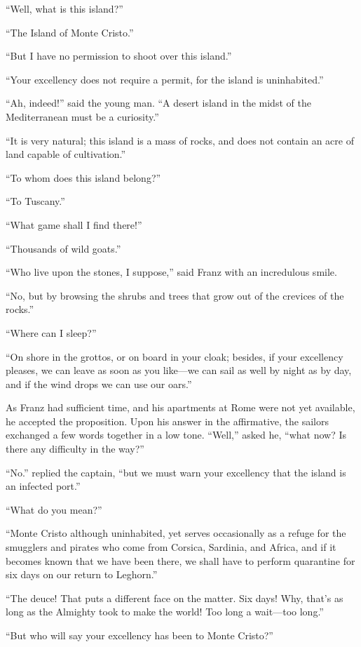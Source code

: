 “Well, what is this island?”

“The Island of Monte Cristo.”

“But I have no permission to shoot over this island.”

“Your excellency does not require a permit, for the island is
uninhabited.”

“Ah, indeed!” said the young man. “A desert island in the midst of the
Mediterranean must be a curiosity.”

“It is very natural; this island is a mass of rocks, and does not
contain an acre of land capable of cultivation.”

“To whom does this island belong?”

“To Tuscany.”

“What game shall I find there!”

“Thousands of wild goats.”

“Who live upon the stones, I suppose,” said Franz with an incredulous
smile.

“No, but by browsing the shrubs and trees that grow out of the crevices
of the rocks.”

“Where can I sleep?”

“On shore in the grottos, or on board in your cloak; besides, if your
excellency pleases, we can leave as soon as you like—we can sail as
well by night as by day, and if the wind drops we can use our oars.”

As Franz had sufficient time, and his apartments at Rome were not yet
available, he accepted the proposition. Upon his answer in the
affirmative, the sailors exchanged a few words together in a low tone.
“Well,” asked he, “what now? Is there any difficulty in the way?”

“No.” replied the captain, “but we must warn your excellency that the
island is an infected port.”

“What do you mean?”

“Monte Cristo although uninhabited, yet serves occasionally as a refuge
for the smugglers and pirates who come from Corsica, Sardinia, and
Africa, and if it becomes known that we have been there, we shall have
to perform quarantine for six days on our return to Leghorn.”

“The deuce! That puts a different face on the matter. Six days! Why,
that’s as long as the Almighty took to make the world! Too long a
wait—too long.”

“But who will say your excellency has been to Monte Cristo?”

